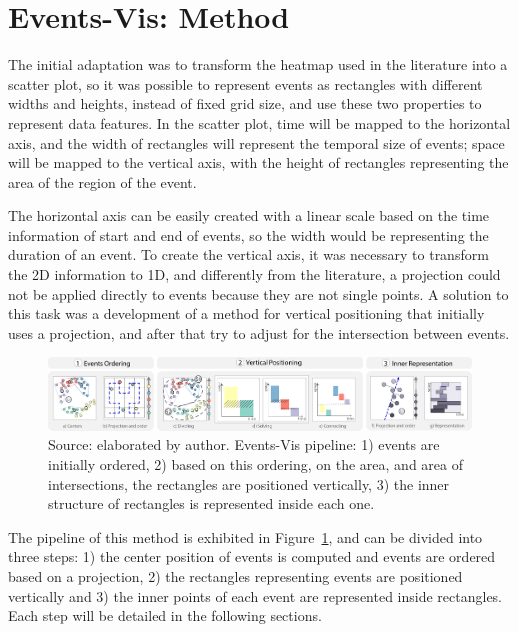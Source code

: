 \section{Events-Vis: Method}

%
The initial adaptation was to transform the heatmap used in the literature into a scatter plot,
%
so it was possible to represent events as rectangles with different widths and heights, instead of fixed grid size, and use these two properties to represent data features.
%
In the scatter plot, time will be mapped to the horizontal axis, and the width of rectangles will represent the temporal size of events; space will be mapped to the vertical axis, with the height of rectangles representing the area of the region of the event.
%

The horizontal axis can be easily created with a linear scale based on the time information of start and end of events, so the width would be representing the duration of an event. 
%
To create the vertical axis, it was necessary to transform the 2D information to 1D, and differently from the literature, a projection could not be applied directly to events because they are not single points.
%
A solution to this task was a development of a method for vertical positioning that initially uses a projection, and after that try to adjust for the intersection between events.

\begin{figure}[th]
    \centering
    \includegraphics[width = \textwidth]{src/imgs/pipeline.pdf}
    \caption{Source: elaborated by author. Events-Vis pipeline: 1) events are initially ordered, 2) based on this ordering, on the area, and area of intersections, the rectangles are positioned vertically, 3) the inner structure of rectangles is represented inside each one.}
    \label{fig:pipeline}
\end{figure}

The pipeline of this method is exhibited in Figure~\ref{fig:pipeline}, and can be divided into three steps: 1) the center position of events is computed and events are ordered based on a projection, 2) the rectangles representing events are positioned vertically and 3) the inner points of each event are represented inside rectangles. Each step will be detailed in the following sections.

